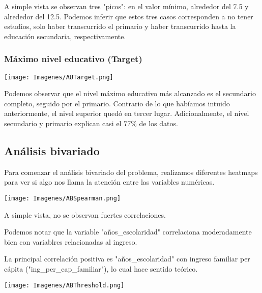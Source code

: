 \documentclass[a4paper]{article}
\begin{document}
            A simple vista se observan tres "picos": en el valor mínimo, alrededor del 7.5 y alrededor del 12.5. Podemos inferir que estos tres casos corresponden a no tener estudios, solo haber transcurrido el primario y haber transcurrido hasta la educación secundaria, respectivamente.
            
            \subsubsection{Máximo nivel educativo (Target)}
            
            \begin{center}
                \texttt{[image: Imagenes/AUTarget.png]}    
            \end{center}
            
            Podemos observar que el nivel máximo educativo más alcanzado es el secundario completo, seguido por el primario. Contrario de lo que habíamos intuido anteriormente, el nivel superior quedó en tercer lugar. Adicionalmente, el nivel secundario y primario explican casi el 77\% de los datos.

    \subsection{Análisis bivariado}

        Para comenzar el análisis bivariado del problema, realizamos diferentes heatmaps para ver si algo nos llama la atención entre las variables numéricas.        
        
        \begin{center}
            \texttt{[image: Imagenes/ABSpearman.png]}
        \end{center}

        A simple vista, no se observan fuertes correlaciones.

        Podemos notar que la variable "años\_escolaridad" correlaciona moderadamente bien con variablres relacionadas al ingreso.

        La principal correlación positiva es "años\_escolaridad" con ingreso familiar per cápita ("ing\_per\_cap\_familiar"), lo cual hace sentido teórico.

        \begin{center}
            \texttt{[image: Imagenes/ABThreshold.png]}
        \end{center}
\end{document}
